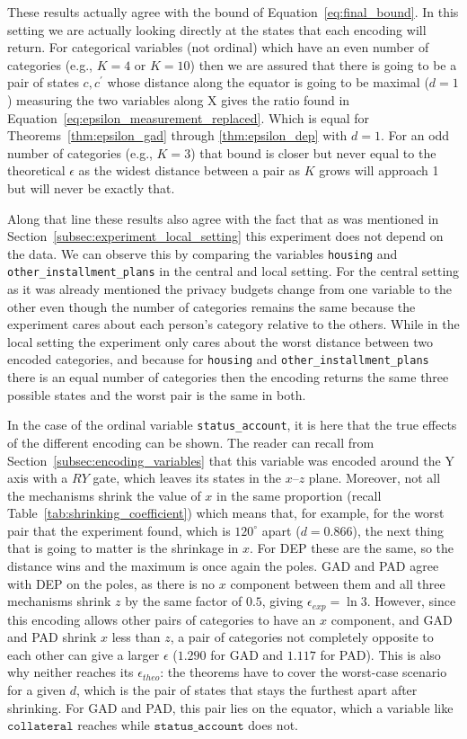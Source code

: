 \documentclass{ieeeaccess}
\begin{document}
These results actually agree with the bound of Equation~\ref{eq:final_bound}. In this setting we are actually looking directly at the states that each encoding will return. For categorical variables (not ordinal) which have an even number of categories (e.g., $K=4$ or $K=10$) then we are assured that there is going to be a pair of states $c, c^{\prime}$ whose distance along the equator is going to be maximal ($d=1$) measuring the two variables along X gives the ratio found in Equation~\ref{eq:epsilon_measurement_replaced}. Which is equal for Theorems~\ref{thm:epsilon_gad} through \ref{thm:epsilon_dep} with $d=1$. For an odd number of categories (e.g., $K=3$) that bound is closer but never equal to the theoretical $\epsilon$ as the widest distance between a pair as $K$ grows will approach 1 but will never be exactly that.

Along that line these results also agree with the fact that as was mentioned in Section~\ref{subsec:experiment_local_setting} this experiment does not depend on the data. We can observe this by comparing the variables \texttt{housing} and \texttt{other\_installment\_plans} in the central and local setting. For the central setting as it was already mentioned the privacy budgets change from one variable to the other even though the number of categories remains the same because the experiment cares about each person's category relative to the others. While in the local setting the experiment only cares about the worst distance between two encoded categories, and because for \texttt{housing} and \texttt{other\_installment\_plans} there is an equal number of categories then the encoding returns the same three possible states and the worst pair is the same in both.

In the case of the ordinal variable \texttt{status\_account}, it is here that the true effects of the different encoding can be shown. The reader can recall from Section~\ref{subsec:encoding_variables} that this variable was encoded around the Y axis with a $RY$ gate, which leaves its states in the $x$--$z$ plane. Moreover, not all the mechanisms shrink the value of $x$ in the same proportion (recall Table~\ref{tab:shrinking_coefficient}) which means that, for example, for the worst pair that the experiment found, which is $120^{\circ}$ apart ($d=0.866$), the next thing that is going to matter is the shrinkage in $x$. For DEP these are the same, so the distance wins and the maximum is once again the poles. GAD and PAD agree with DEP on the poles, as there is no $x$ component between them and all three mechanisms shrink $z$ by the same factor of $0.5$, giving $\epsilon_{exp} = \ln 3$. However, since this encoding allows other pairs of categories to have an $x$ component, and GAD and PAD shrink $x$ less than $z$, a pair of categories not completely opposite to each other can give a larger $\epsilon$ ($1.290$ for GAD and $1.117$ for PAD). This is also why neither reaches its $\epsilon_{theo}$: the theorems have to cover the worst-case scenario for a given $d$, which is the pair of states that stays the furthest apart after shrinking. For GAD and PAD, this pair lies on the equator, which a variable like $\texttt{collateral}$ reaches while $\texttt{status\_account}$ does not.
\end{document}
